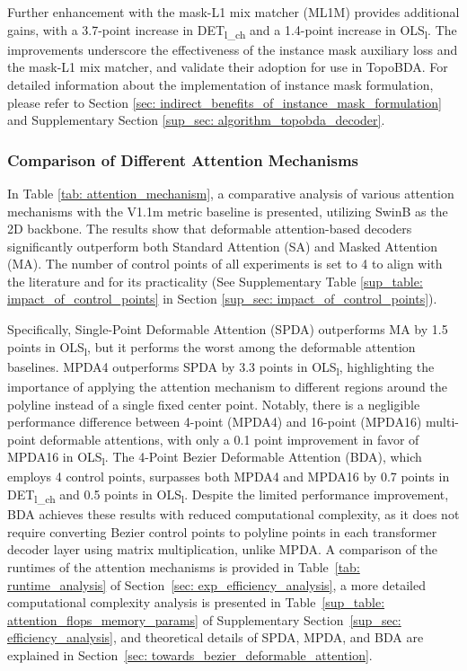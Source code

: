 Further enhancement with the mask-L1 mix matcher (ML1M) provides additional gains, with a 3.7-point increase in DET\textsubscript{l\_ch} and a 1.4-point increase in OLS\textsubscript{l}. The improvements underscore the effectiveness of the instance mask auxiliary loss and the mask-L1 mix matcher, and validate their adoption for use in TopoBDA. For detailed information about the implementation of instance mask formulation, please refer to Section \ref{sec: indirect_benefits_of_instance_mask_formulation} and Supplementary Section \ref{sup_sec: algorithm_topobda_decoder}. 



\subsubsection{Comparison of Different Attention Mechanisms}
\label{sec: exp_diff_attention_mechanism}

In Table \ref{tab: attention_mechanism}, a comparative analysis of various attention mechanisms with the V1.1m metric baseline is presented, utilizing SwinB as the 2D backbone. The results show that deformable attention-based decoders significantly outperform both Standard Attention (SA) and Masked Attention (MA). The number of control points of all experiments is set to 4 to align with the literature \cite{wu2023topomlp} and for its practicality (See Supplementary Table \ref{sup_table: impact_of_control_points} in Section \ref{sup_sec: impact_of_control_points}). 

Specifically, Single-Point Deformable Attention (SPDA) outperforms MA by 1.5 points in OLS\textsubscript{l}, but it performs the worst among the deformable attention baselines. MPDA4 outperforms SPDA by 3.3 points in OLS\textsubscript{l}, highlighting the importance of applying the attention mechanism to different regions around the polyline instead of a single fixed center point. Notably, there is a negligible performance difference between 4-point (MPDA4) and 16-point (MPDA16) multi-point deformable attentions, with only a 0.1 point improvement in favor of MPDA16 in OLS\textsubscript{l}. The 4-Point Bezier Deformable Attention (BDA), which employs 4 control points, surpasses both MPDA4 and MPDA16 by 0.7 points in DET\textsubscript{l\_ch} and 0.5 points in OLS\textsubscript{l}. Despite the limited performance improvement, BDA achieves these results with reduced computational complexity, as it does not require converting Bezier control points to polyline points in each transformer decoder layer using matrix multiplication, unlike MPDA. A comparison of the runtimes of the attention mechanisms is provided in Table~\ref{tab: runtime_analysis} of Section~\ref{sec: exp_efficiency_analysis}, a more detailed computational complexity analysis is presented in Table~\ref{sup_table: attention_flops_memory_params} of Supplementary Section~\ref {sup_sec: efficiency_analysis}, and theoretical details of SPDA, MPDA, and BDA are explained in Section~\ref{sec: towards_bezier_deformable_attention}.


